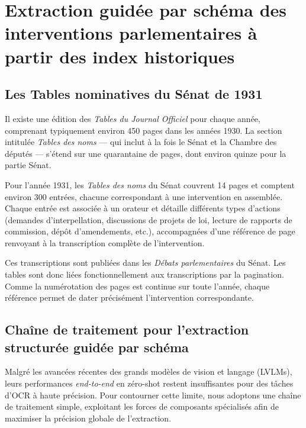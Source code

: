 \section{Extraction guidée par schéma des interventions parlementaires à partir des index historiques}

\subsection{Les Tables nominatives du Sénat de 1931}

Il existe une édition des \emph{Tables du Journal Officiel} pour chaque année, comprenant typiquement environ 450 pages dans les années 1930. La section intitulée \emph{Tables des noms} — qui inclut à la fois le Sénat et la Chambre des députés — s’étend sur une quarantaine de pages, dont environ quinze pour la partie Sénat.

Pour l’année 1931, les \emph{Tables des noms} du Sénat couvrent 14 pages et comptent environ 300 entrées, chacune correspondant à une intervention en assemblée. Chaque entrée est associée à un orateur et détaille différents types d’actions (demandes d’interpellation, discussions de projets de loi, lecture de rapports de commission, dépôt d’amendements, etc.), accompagnées d’une référence de page renvoyant à la transcription complète de l’intervention.

Ces transcriptions sont publiées dans les \emph{Débats parlementaires} du Sénat. Les tables sont donc liées fonctionnellement aux transcriptions par la pagination. Comme la numérotation des pages est continue sur toute l’année, chaque référence permet de dater précisément l’intervention correspondante.

\subsection{Chaîne de traitement pour l’extraction structurée guidée par schéma}

Malgré les avancées récentes des grands modèles de vision et langage (LVLMs), leurs performances \emph{end-to-end} en zéro-shot restent insuffisantes pour des tâches d’OCR à haute précision. Pour contourner cette limite, nous adoptons une chaîne de traitement simple, exploitant les forces de composants spécialisés afin de maximiser la précision globale de l’extraction.

